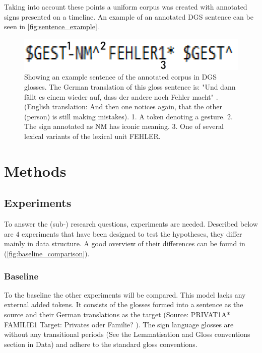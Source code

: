 Taking into account these points a uniform corpus was created with annotated signs presented on a timeline. An example of an annotated DGS sentence can be seen in \autoref{fig:sentence_example}.

\begin{figure}[h]
\caption{Showing an example sentence of the annotated corpus in DGS glosses. The German translation of this gloss sentence is: "Und dann fällt es einem wieder auf, dass der andere noch Fehler macht" \cite{dgscorpus_3}. (English translation: And then one notices again, that the other (person) is still making mistakes). 1. A token denoting a gesture. 2. The sign annotated as NM has iconic meaning. 3. One of several lexical variants of the lexical unit FEHLER.}
 \centering 
 \includegraphics[width=14cm]{Bachelor CSAI thesis template/images/sentence_example.png}
 
 \label{fig:sentence_example}
\end{figure}

\section{Methods}

\subsection{Experiments}

To answer the (sub-) research questions, experiments are needed. Described below are $4$ experiments that have been designed to test the hypotheses, they differ mainly in data structure. A good overview of their differences can be found in (\autoref{fig:baseline_comparison}). 

\subsubsection{Baseline}

To the baseline the other experiments will be compared. This model lacks any external added tokens. It consists of the glosses formed into a sentence as the source and their German translations as the target (Source: PRIVAT1A* FAMILIE1 Target: Privates oder Familie? \cite{dgscorpus_3}). The sign language glosses are without any transitional periods (See the Lemmatisation and Gloss conventions section in Data) and adhere to the standard gloss conventions.


